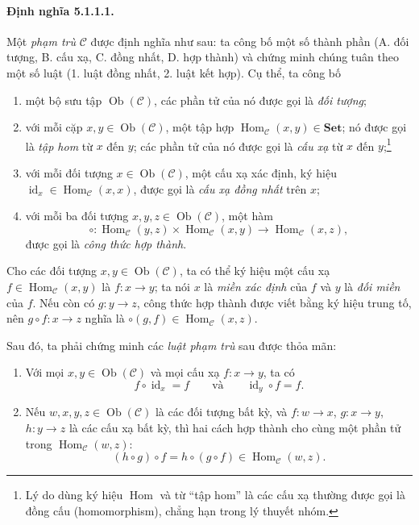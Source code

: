 \paragraph{Định nghĩa 5.1.1.1.} Một \emph{phạm trù} $\mathcal C$ được định nghĩa như sau: ta công bố một số thành phần (A. đối tượng, B. cấu xạ, C. đồng nhất, D. hợp thành) và chứng minh chúng tuân theo một số luật (1. luật đồng nhất, 2. luật kết hợp). Cụ thể, ta công bố
\begin{enumerate}[label=\Alph*.]
\item một bộ sưu tập $\operatorname{Ob}(\mathcal C)$, các phần tử của nó được gọi là \emph{đối tượng};
\item với mỗi cặp $x,y\in\operatorname{Ob}(\mathcal C)$, một tập hợp $\operatorname{Hom}_{\mathcal C}(x,y)\in\mathbf{Set}$; nó được gọi là \emph{tập hom} từ $x$ đến $y$; các phần tử của nó được gọi là \emph{cấu xạ} từ $x$ đến $y$;\footnote{Lý do dùng ký hiệu $\operatorname{Hom}$ và từ ``tập hom'' là các cấu xạ thường được gọi là đồng cấu (homomorphism), chẳng hạn trong lý thuyết nhóm.}
\item với mỗi đối tượng $x\in\operatorname{Ob}(\mathcal C)$, một cấu xạ xác định, ký hiệu $\operatorname{id}_x\in\operatorname{Hom}_{\mathcal C}(x,x)$, được gọi là \emph{cấu xạ đồng nhất} trên $x$;
\item với mỗi ba đối tượng $x,y,z\in\operatorname{Ob}(\mathcal C)$, một hàm
\[\circ:\operatorname{Hom}_{\mathcal C}(y,z)\times\operatorname{Hom}_{\mathcal C}(x,y)\longrightarrow\operatorname{Hom}_{\mathcal C}(x,z),\]
được gọi là \emph{công thức hợp thành}.
\end{enumerate}
Cho các đối tượng $x,y\in\operatorname{Ob}(\mathcal C)$, ta có thể ký hiệu một cấu xạ $f\in\operatorname{Hom}_{\mathcal C}(x,y)$ là $f:x\to y$; ta nói $x$ là \emph{miền xác định} của $f$ và $y$ là \emph{đối miền} của $f$. Nếu còn có $g:y\to z$, công thức hợp thành được viết bằng ký hiệu trung tố, nên $g\circ f:x\to z$ nghĩa là $\circ(g,f)\in\operatorname{Hom}_{\mathcal C}(x,z)$.

Sau đó, ta phải chứng minh các \emph{luật phạm trù} sau được thỏa mãn:
\begin{enumerate}
\item Với mọi $x,y\in\operatorname{Ob}(\mathcal C)$ và mọi cấu xạ $f:x\to y$, ta có
\[f\circ\operatorname{id}_x=f\qquad\text{và}\qquad\operatorname{id}_y\circ f=f.\]
\item Nếu $w,x,y,z\in\operatorname{Ob}(\mathcal C)$ là các đối tượng bất kỳ, và $f:w\to x$, $g:x\to y$, $h:y\to z$ là các cấu xạ bất kỳ, thì hai cách hợp thành cho cùng một phần tử trong $\operatorname{Hom}_{\mathcal C}(w,z)$:
\[(h\circ g)\circ f=h\circ(g\circ f)\in\operatorname{Hom}_{\mathcal C}(w,z).\]
\end{enumerate}
